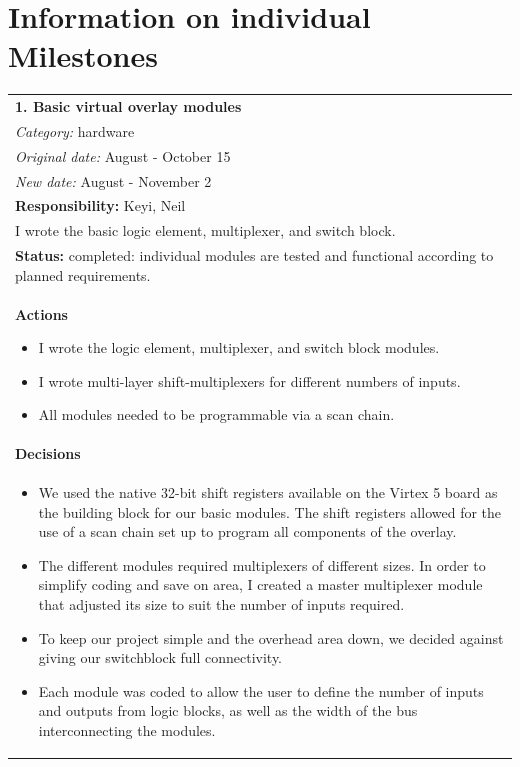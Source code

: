 \documentclass[12pt,letterpaper]{article}
\begin{document}
\section{Information on individual Milestones}

\begin{tabular}{|p{6.4in}|}
\hline
\textbf{1. Basic virtual overlay modules} \\
\emph{Category:} hardware \\
\emph{Original date:} August - October 15 \\
\emph{New date:} August - November 2 \\
\hline
\textbf{Responsibility:} Keyi, Neil \\
I wrote the basic logic element, multiplexer, and switch block. \\
\hline
\textbf{Status:} completed: individual modules are tested and functional according to planned requirements. \\
\hline
\textbf{Actions}
\begin{itemize}
\item I wrote the logic element, multiplexer, and switch block modules.
\item I wrote multi-layer shift-multiplexers for different numbers of inputs.
\item All modules needed to be programmable via a scan chain.
\end{itemize} \\
\hline
\textbf{Decisions} \\
\vspace{-1em}
\begin{itemize}
\item We used the native 32-bit shift registers available on the Virtex 5 board as the building block for our basic modules. The shift registers allowed for the use of a scan chain set up to program all components of the overlay.
\item The different modules required multiplexers of different sizes. In order to simplify coding and save on area, I created a master multiplexer module that adjusted its size to suit the number of inputs required.
\item To keep our project simple and the overhead area down, we decided against giving our switchblock full connectivity.
\item Each module was coded to allow the user to define the number of inputs and outputs from logic blocks, as well as the width of the bus interconnecting the modules.

\end{itemize}
\end{tabular}
\end{document}
